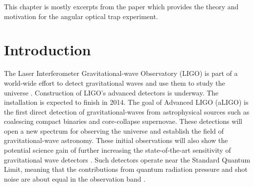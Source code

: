 \newcommand{\tcr}{\textcolor{red}}
\newcommand{\tcb}{\textcolor{blue}}
\newcommand{\tcm}{\textcolor{magenta}}
\newcommand{\tcg}{\textcolor{green}}
\newcommand{\tcp}{\textcolor{purple}}
\newcommand{\irm}{\mathrm{i}}


This chapter is mostly excerpts from the paper which provides the theory and
motivation for the angular optical trap experiment.\cite{PhysRevD.89.122002}

\section{Introduction}
\label{sec:int}

The Laser Interferometer Gravitational-wave Observatory (LIGO) is part of a world-wide 
effort to detect gravitational waves and use them to study the universe \cite{BPAbbott09}. Construction of 
LIGO's advanced detectors is underway. The installation is expected to finish in 2014. The goal of Advanced LIGO (aLIGO) is the first direct detection of gravitational-waves 
from astrophysical sources such as coalescing compact binaries and core-collapse supernovae.
These detections will open a new spectrum for observing the universe and establish the field of 
gravitational-wave astronomy. 
These initial observations will also show the potential science gain of further increasing the state-of-the-art sensitivity of gravitational wave detectors \cite{Smith09,Harry10,Losurdo12}. Such detectors operate near the Standard Quantum Limit, meaning that the contributions from quantum radiation pressure and shot noise are about equal in the observation band \cite{Caves80, Ni86}.

